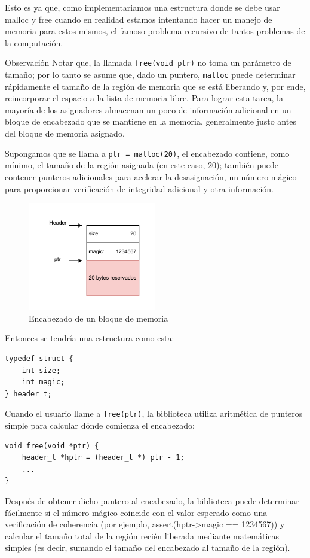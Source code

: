 \documentclass{article}
\begin{document}
Esto es ya que, como implementariamos una estructura donde se debe usar malloc y free cuando en realidad estamos intentando hacer un manejo de memoria para estos mismos, el famoso problema recursivo de tantos problemas de la computación.

\begin{summary}{Observación}
    Notar que, la llamada \texttt{free(void \*ptr)} no toma un parámetro de tamaño; por lo tanto se asume que, dado un puntero, \texttt{malloc} puede determinar rápidamente el tamaño de la región de memoria que se está liberando y, por ende, reincorporar el espacio a la lista de memoria libre. Para lograr esta tarea, la mayoría de los asignadores almacenan un poco de información adicional en un bloque de encabezado que se mantiene en la memoria, generalmente justo antes del bloque de memoria asignado. 
\end{summary}

Supongamos que se llama a \texttt{ptr = malloc(20)}, el encabezado contiene, como mínimo, el tamaño de la región asignada (en este caso, 20); también puede contener punteros adicionales para acelerar la desasignación, un número mágico para proporcionar verificación de integridad adicional y otra información.

\begin{figure}[h]
    \centering
    \includegraphics[width=0.5\textwidth]{src/malloc.pdf}
    \caption{Encabezado de un bloque de memoria}
\end{figure}
Entonces se tendría una estructura como esta:
\begin{verbatim}
typedef struct {
    int size;
    int magic;
} header_t;
\end{verbatim}
Cuando el usuario llame a \texttt{free(ptr)}, la biblioteca utiliza aritmética de punteros simple para calcular dónde comienza el encabezado:
\begin{verbatim}
void free(void *ptr) {
    header_t *hptr = (header_t *) ptr - 1;
    ...
}      
\end{verbatim}
Después de obtener dicho puntero al encabezado, la biblioteca puede determinar fácilmente si el número mágico coincide con el valor esperado como una verificación de coherencia (por ejemplo, assert(hptr->magic == 1234567)) y calcular el tamaño total de la región recién liberada mediante matemáticas simples (es decir, sumando el tamaño del encabezado al tamaño de la región). 
\end{document}
